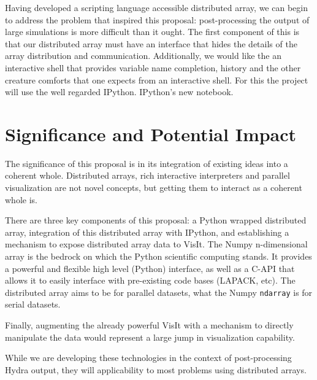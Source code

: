 \documentclass[a4paper]{article}
\begin{document}
Having developed a scripting language accessible distributed array, we can begin to address the problem that inspired this proposal: post-processing the output of large simulations is more difficult than it ought.  The first component of this is that our distributed array must have an interface that hides the details of the array distribution and communication.  Additionally, we would like the an interactive shell that provides variable name completion, history and the other creature comforts that one expects from an interactive shell.  For this the project will use the well regarded IPython.  IPython's new notebook\cite{ipython-notebook}.







\section*{Significance and Potential Impact}
The significance of this proposal is in its integration of existing ideas into a coherent whole.  Distributed arrays, rich interactive interpreters and parallel visualization are not novel concepts, but getting them to interact as a coherent whole is.

There are three key components of this proposal: a Python wrapped distributed array, integration of this distributed array with IPython, and establishing a mechanism to expose distributed array data to VisIt.  The Numpy n-dimensional array is the bedrock on which the Python scientific computing stands.  It provides a powerful and flexible high level (Python) interface, as well as a C-API that allows it to easily interface with pre-existing code bases (LAPACK, etc).  The distributed array aims to be for parallel datasets, what the Numpy \texttt{ndarray} is for serial datasets.

Finally, augmenting the already powerful VisIt with a mechanism to directly manipulate the data would represent a large jump in visualization capability.

While we are developing these technologies in the context of post-processing Hydra output, they will applicability to most problems using distributed arrays.
\end{document}
